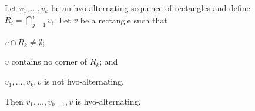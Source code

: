 \documentclass[lotsofwhite]{patmorin}
\begin{document}
%
%
%
%
%
%

\begin{lem}
  Let $v_1,\ldots,v_k$ be an hvo-alternating sequence of rectangles and
  define $R_i=\bigcap_{j=1}^i v_i$. Let $v$ be a rectangle such
  that 
  \begin{compactenum}
     \item $v\cap R_k\ne \emptyset$; 
     \item $v$ contains no corner of $R_k$; and 
     \item $v_1,\ldots,v_k,v$ is not hvo-alternating.
  \end{compactenum}
  Then $v_1,\ldots,v_{k-1},v$ is hvo-alternating.
\end{lem}
\end{document}
